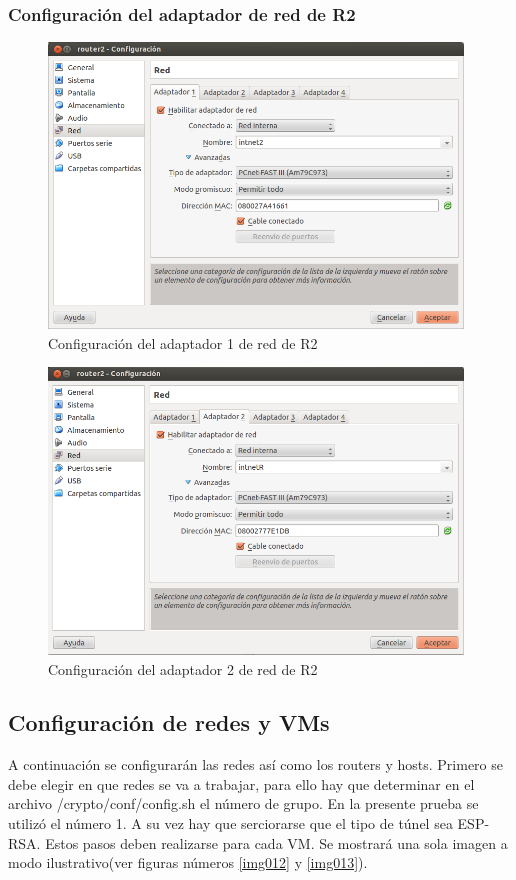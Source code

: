 \documentclass[a4paper,10pt]{article}
\begin{document}
			\subsubsection{Configuración del adaptador de red de R2}	
	\begin{figure}[!htb]
		\centering
		\includegraphics[width=11cm]{Imagenes/Router2ConfigAdaptador1.png}
		\caption{Configuración del adaptador 1 de red de R2} \label{img010}
	\end{figure}	
	\begin{figure}[!htb]
		\centering
		\includegraphics[width=11cm]{Imagenes/Router2ConfigAdaptador2.png}
		\caption{Configuración del adaptador 2 de red de R2} \label{img011}
	\end{figure}		
		
		\subsection{Configuraci\'on de redes y VMs}	
	\indent A continuaci\'on se configurar\'an las redes as\'i como los routers y hosts. Primero se debe elegir en que redes se va a trabajar, para ello hay que determinar en el archivo /crypto/conf/config.sh el número de grupo. En la presente prueba se utilizó el número 1. A su vez hay que serciorarse que el tipo de túnel sea ESP-RSA.
	\indent Estos pasos deben realizarse para cada VM. Se mostrará una sola imagen a modo ilustrativo(ver figuras números \ref{img012} y \ref{img013}).
	
\end{document}
